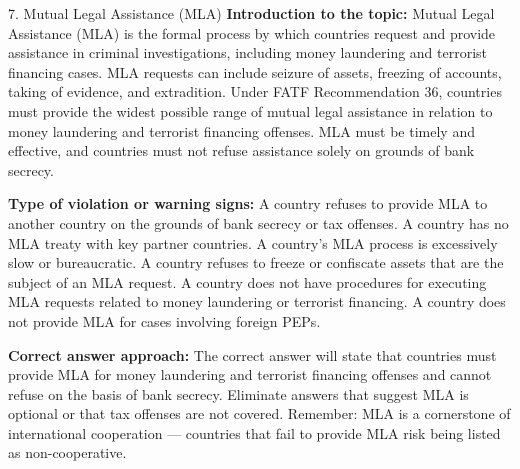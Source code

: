 \documentclass[11pt,a4paper]{beamer}
\begin{document}
\begin{frame}{7. Mutual Legal Assistance (MLA)}
\tiny
\noindent\textbf{Introduction to the topic:} Mutual Legal Assistance (MLA) is the formal process by which countries request and provide assistance in criminal investigations, including money laundering and terrorist financing cases. MLA requests can include seizure of assets, freezing of accounts, taking of evidence, and extradition. Under FATF Recommendation 36, countries must provide the widest possible range of mutual legal assistance in relation to money laundering and terrorist financing offenses. MLA must be timely and effective, and countries must not refuse assistance solely on grounds of bank secrecy.

\vspace{0.1cm}
\noindent\textbf{Type of violation or warning signs:} A country refuses to provide MLA to another country on the grounds of bank secrecy or tax offenses. A country has no MLA treaty with key partner countries. A country's MLA process is excessively slow or bureaucratic. A country refuses to freeze or confiscate assets that are the subject of an MLA request. A country does not have procedures for executing MLA requests related to money laundering or terrorist financing. A country does not provide MLA for cases involving foreign PEPs.

\vspace{0.1cm}
\noindent\textbf{Correct answer approach:} The correct answer will state that countries must provide MLA for money laundering and terrorist financing offenses and cannot refuse on the basis of bank secrecy. Eliminate answers that suggest MLA is optional or that tax offenses are not covered. Remember: MLA is a cornerstone of international cooperation — countries that fail to provide MLA risk being listed as non-cooperative.
\end{frame}
\end{document}
